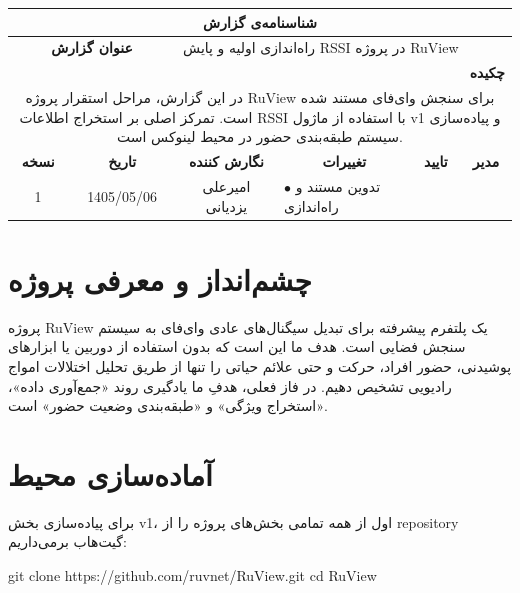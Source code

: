 \documentclass[12pt, a4paper]{article}
\newcommand{\lr}[1]{\foreignlanguage{english}{#1}}
\begin{document}
\thispagestyle{empty}

\begin{center}
\renewcommand{\arraystretch}{1.8}
\begin{tabularx}{\textwidth}{|c|c|c|X|c|c|}
\hline
\multicolumn{6}{|c|}{\textbf{شناسنامه‌ی گزارش}} \\
\hline
\multicolumn{2}{|c|}{\textbf{عنوان گزارش}} & \multicolumn{4}{l|}{راه‌اندازی اولیه و پایش \lr{RSSI} در پروژه \lr{RuView}} \\
\hline
\multicolumn{6}{|r|}{\textbf{چکیده}} \\
\hline
\multicolumn{6}{|p{\dimexpr\textwidth-2\tabcolsep-2\arrayrulewidth\relax}|}{
در این گزارش، مراحل استقرار پروژه \lr{RuView} برای سنجش وای‌فای مستند شده است. تمرکز اصلی بر استخراج اطلاعات \lr{RSSI} با استفاده از ماژول \lr{v1} و پیاده‌سازی سیستم طبقه‌بندی حضور در محیط لینوکس است.
} \\
\hline
\textbf{نسخه} & \textbf{تاریخ} & \textbf{نگارش کننده} & \multicolumn{1}{c|}{\textbf{تغییرات}} & \textbf{تایید} & \textbf{مدیر} \\
\hline
1 & 1405/05/06 & امیرعلی یزدیانی & $\bullet$ تدوین مستند و راه‌اندازی & & \\
\hline
\end{tabularx}
\end{center}

\vspace{1cm}
\tableofcontents
\newpage

\section{چشم‌انداز و معرفی پروژه}
پروژه \lr{RuView} یک پلتفرم پیشرفته برای تبدیل سیگنال‌های عادی وای‌فای به سیستم سنجش فضایی است. هدف ما این است که بدون استفاده از دوربین یا ابزارهای پوشیدنی، حضور افراد، حرکت و حتی علائم حیاتی را تنها از طریق تحلیل اختلالات امواج رادیویی تشخیص دهیم. در فاز فعلی، هدفِ ما یادگیری روند «جمع‌آوری داده»، «استخراج ویژگی» و «طبقه‌بندی وضعیت حضور» است.

\section{آماده‌سازی محیط}
برای پیاده‌سازی بخش \lr{v1}، اول از همه تمامی بخش‌های پروژه را از \lr{repository} گیت‌هاب برمی‌داریم:

\begin{otherlanguage}{english}
\begin{terminalbox}
git clone https://github.com/ruvnet/RuView.git
cd RuView
\end{terminalbox}
\end{otherlanguage}
\end{document}
